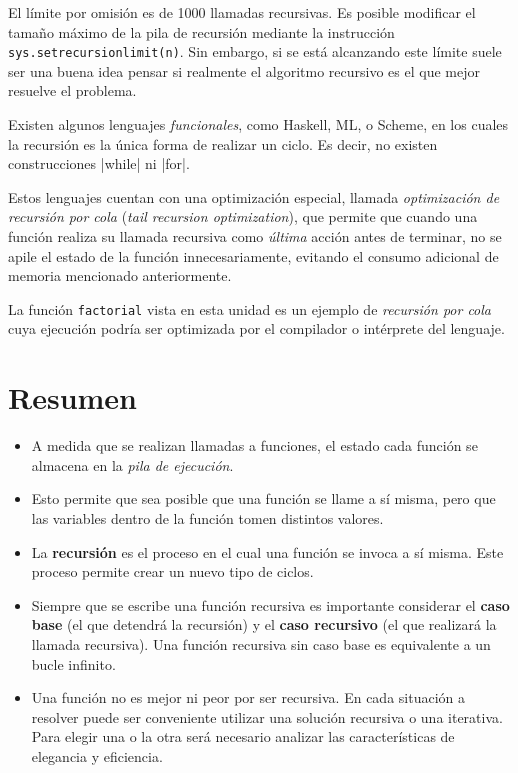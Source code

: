 El límite por omisión es de 1000 llamadas recursivas. Es posible modificar
el tamaño máximo de la pila de recursión mediante la instrucción
\lstinline!sys.setrecursionlimit(n)!.  Sin embargo, si se está alcanzando
este límite suele ser una buena idea pensar si realmente el algoritmo
recursivo es el que mejor resuelve el problema.

\begin{sabias_que}
Existen algunos lenguajes {\it funcionales}, como Haskell, ML, o Scheme, en
los cuales la recursión es la única forma de realizar un ciclo.  Es
decir, no existen construcciones |while| ni |for|.

Estos lenguajes cuentan con una optimización especial, llamada {\it
optimización de recursión por cola} ({\it tail recursion optimization}),
que permite que cuando una función realiza su llamada recursiva como {\it
última} acción antes de terminar, no se apile el estado de la función
innecesariamente, evitando el consumo adicional de memoria mencionado
anteriormente.

La función \lstinline!factorial! vista en esta unidad es un ejemplo de {\it
recursión por cola} cuya ejecución podría ser optimizada por el compilador o
intérprete del lenguaje.
\end{sabias_que}

\section{Resumen}

\begin{itemize}

\item A medida que se realizan llamadas a funciones, el estado cada
función se almacena en la {\it pila de ejecución}.

\item Esto permite que sea posible que una función se llame a sí misma,
pero que las variables dentro de la función tomen distintos valores.

\item La {\bf recursión} es el proceso en el cual una función se invoca a
sí misma.  Este proceso permite crear un nuevo tipo de ciclos.

\item Siempre que se escribe una función recursiva es importante considerar
el {\bf caso base} (el que detendrá la recursión) y el {\bf caso
recursivo} (el que realizará la llamada recursiva).  Una función recursiva
sin caso base es equivalente a un bucle infinito.

\item Una función no es mejor ni peor por ser recursiva.  En cada situación
a resolver puede ser conveniente utilizar una solución recursiva o una
iterativa.  Para elegir una o la otra será necesario analizar las
características de elegancia y eficiencia.

\end{itemize}


